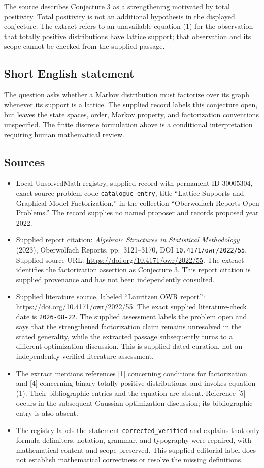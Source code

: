 \documentclass[11pt]{article}
\begin{document}
The source describes Conjecture 3 as a strengthening motivated by total positivity. Total positivity is not an additional hypothesis in the displayed conjecture. The extract refers to an unavailable equation (1) for the observation that totally positive distributions have lattice support; that observation and its scope cannot be checked from the supplied passage.
\subsection{Short English statement}
The question asks whether a Markov distribution must factorize over its graph whenever its support is a lattice. The supplied record labels this conjecture open, but leaves the state spaces, order, Markov property, and factorization conventions unspecified. The finite discrete formulation above is a conditional interpretation requiring human mathematical review.
\subsection{Sources}
\begin{itemize}
\item Local UnsolvedMath registry, supplied record with permanent ID \(30005304\), exact source problem code \texttt{catalogue entry}, title ``Lattice Supports and Graphical Model Factorization,'' in the collection ``Oberwolfach Reports Open Problems.'' The record supplies no named proposer and records proposed year 2022.
\item Supplied report citation: \emph{Algebraic Structures in Statistical Methodology} (2023), Oberwolfach Reports, pp.\ 3121--3170, DOI \texttt{10.4171/owr/2022/55}. Supplied source URL: \url{https://doi.org/10.4171/owr/2022/55}. The extract identifies the factorization assertion as Conjecture 3. This report citation is supplied provenance and has not been independently consulted.
\item Supplied literature source, labeled ``Lauritzen OWR report'': \url{https://doi.org/10.4171/owr/2022/55}. The exact supplied literature-check date is \texttt{2026-08-22}. The supplied assessment labels the problem open and says that the strengthened factorization claim remains unresolved in the stated generality, while the extracted passage subsequently turns to a different optimization discussion. This is supplied dated curation, not an independently verified literature assessment.
\item The extract mentions references [1] concerning conditions for factorization and [4] concerning binary totally positive distributions, and invokes equation (1). Their bibliographic entries and the equation are absent. Reference [5] occurs in the subsequent Gaussian optimization discussion; its bibliographic entry is also absent.
\item The registry labels the statement \texttt{corrected\_verified} and explains that only formula delimiters, notation, grammar, and typography were repaired, with mathematical content and scope preserved. This supplied editorial label does not establish mathematical correctness or resolve the missing definitions.
\end{itemize}
\end{document}
